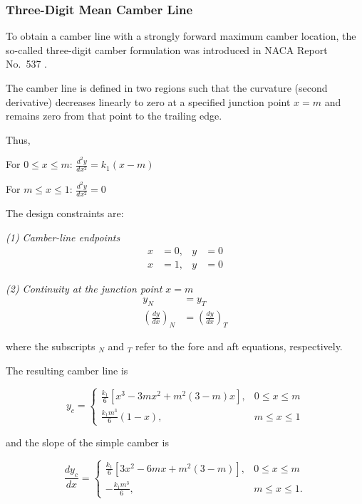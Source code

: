 \subsubsection*{Three-Digit Mean Camber Line}


To obtain a camber line with a strongly forward maximum camber location, 
the so-called three-digit camber formulation was introduced in NACA Report No.~537 \cite{NACA_TR_537}. 

The camber line is defined in two regions such that the curvature 
(second derivative) decreases linearly to zero at a specified junction 
point $x = m$ and remains zero from that point to the trailing edge.

Thus,

For $0 \le x \le m$:\quad
$
\displaystyle \frac{d^2 y}{dx^2} = k_1 (x - m)
$

For $m \le x \le 1$:\quad
$
\displaystyle \frac{d^2 y}{dx^2} = 0
$

The design constraints are:

\textit{(1) Camber-line endpoints}
\begin{align*}
x &= 0, & y &= 0 \\
x &= 1, & y &= 0
\end{align*}

\textit{(2) Continuity at the junction point $x = m$}
\begin{align*}
y_N &= y_T \\[6pt]
\left( \frac{dy}{dx} \right)_N &= 
\left( \frac{dy}{dx} \right)_T
\end{align*}


where the subscripts $_N$ and $_T$ refer to the fore and aft equations, respectively. 

The resulting camber line is

\begin{equation}
y_c =
\begin{cases}
\displaystyle 
\frac{k_1}{6}
\left[
x^3 - 3mx^2 + m^2(3-m)x
\right],
& 0 \le x \le m \\[12pt]

\displaystyle 
\frac{k_1 m^3}{6}(1-x),
& m \le x \le 1
\end{cases}
\end{equation}

and the slope of the simple camber is

\begin{equation}
\frac{dy_c}{dx} =
\begin{cases}
\displaystyle 
\frac{k_1}{6}
\left[
3x^2 - 6mx + m^2(3-m)
\right],
& 0 \le x \le m \\[12pt]

\displaystyle 
-\frac{k_1 m^3}{6},
& m \le x \le 1.
\end{cases}
\end{equation}

